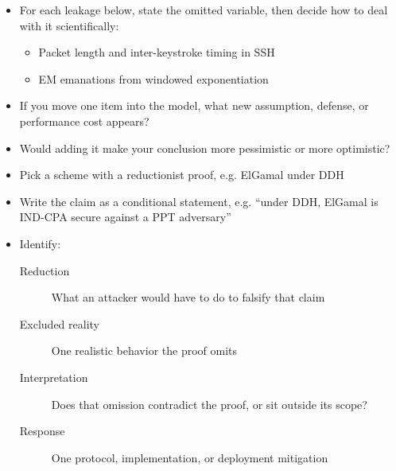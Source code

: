 \begin{frame}
  \begin{activity}
  \begin{itemize}
    \item For each leakage below, state the omitted variable, then decide how 
      to deal with it scientifically:
      \begin{itemize}
        \item Packet length and inter-keystroke timing in SSH
        \item EM emanations from windowed exponentiation
      \end{itemize}
    \item If you move one item into the model, what new assumption, defense, 
      or performance cost appears?
    \item Would adding it make your conclusion more pessimistic or more 
      optimistic?
  \end{itemize}
  \end{activity}
\end{frame}

\begin{frame}
  \begin{activity}
  \begin{itemize}
    \item Pick a scheme with a reductionist proof, e.g. ElGamal under DDH
    \item Write the claim as a conditional statement, e.g. \enquote{under 
      DDH, ElGamal is IND-CPA secure against a PPT adversary}
    \item Identify:
      \begin{description}
        \item[Reduction] What an attacker would have to do to falsify that 
          claim
        \item[Excluded reality] One realistic behavior the proof omits
        \item[Interpretation] Does that omission contradict the proof, or sit 
          outside its scope?
        \item[Response] One protocol, implementation, or deployment mitigation
      \end{description}
  \end{itemize}
  \end{activity}
\end{frame}


